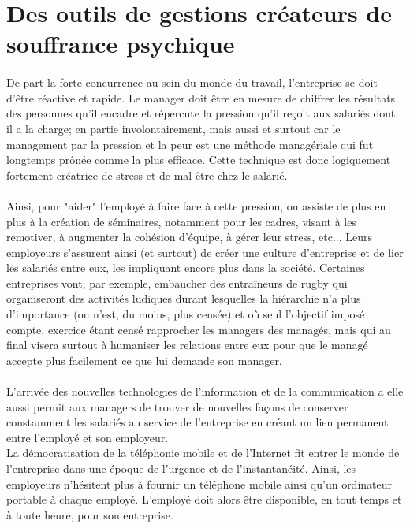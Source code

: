 \documentclass{report}
\begin{document}
	\section{Des outils de gestions créateurs de souffrance psychique}
		\paragraph{}
			De part la forte concurrence au sein du monde du travail, l'entreprise se doit d'être réactive et rapide. Le manager doit être en mesure de chiffrer les résultats des personnes qu'il encadre et répercute la pression qu'il reçoit aux salariés dont il a la charge; en partie involontairement, mais aussi et surtout car le management par la pression et la peur est une méthode managériale qui fut longtemps prônée comme la plus efficace. Cette technique est donc logiquement fortement créatrice de stress et de mal-être chez le salarié.
		\paragraph{}
		 	Ainsi, pour "aider" l'employé à faire face à cette pression, on assiste de plus en plus à la création de séminaires, notamment pour les cadres, visant à les remotiver, à augmenter la cohésion d'équipe, à gérer leur stress, etc... Leurs employeurs s'assurent ainsi (et surtout) de créer une culture d'entreprise et de lier les salariés entre eux, les impliquant encore plus dans la société. Certaines entreprises vont, par exemple, embaucher des entraîneurs de rugby qui organiseront des activités ludiques durant lesquelles la hiérarchie n'a plus d'importance (ou n'est, du moins, plus censée) et où seul l'objectif imposé compte, exercice étant censé rapprocher les managers des managés, mais qui au final visera surtout à humaniser les relations entre eux pour que le managé accepte plus facilement ce que lui demande son manager. 
		\paragraph{}
			L'arrivée des nouvelles technologies de l'information et de la communication a elle aussi permit aux managers de trouver de nouvelles façons de conserver constamment les salariés au service de l'entreprise en créant un lien permanent entre l'employé et son employeur. \\La démocratisation de la téléphonie mobile et de l'Internet fit entrer le monde de l'entreprise dans une époque de l'urgence et de l'instantanéité. Ainsi, les employeurs n'hésitent plus à fournir un téléphone mobile ainsi qu'un ordinateur portable à chaque employé. L'employé doit alors être disponible, en tout temps et à toute heure, pour son entreprise.
\end{document}
